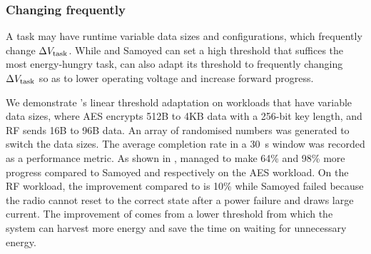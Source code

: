 
\subsubsection{Changing frequently}



A task may have runtime variable data sizes and configurations, which frequently change $\Delta V_{\text{task}}$.
While \debs{} and Samoyed can set a high threshold that suffices the most energy-hungry task, \nn{} can also adapt its threshold to frequently changing $\Delta V_{\text{task}}$ so as to lower operating voltage and increase forward progress.

We demonstrate \nn{}'s linear threshold adaptation on workloads that have variable data sizes, where AES encrypts 512B to 4KB data with a 256-bit key length, and RF sends 16B to 96B data. 
An array of randomised numbers was generated to switch the data sizes. 
The average completion rate in a \SI{30}{\second} window was recorded as a performance metric.
As shown in , \nn{} managed to make 64\% and 98\% more progress compared to Samoyed and \debs{} respectively on the AES workload. On the RF workload, the improvement compared to \debs{} is 10\% while Samoyed failed because the radio cannot reset to the correct state after a power failure and draws large current. 
The improvement of \nn{} comes from a lower threshold from which the system can harvest more energy and save the time on waiting for unnecessary energy. 

